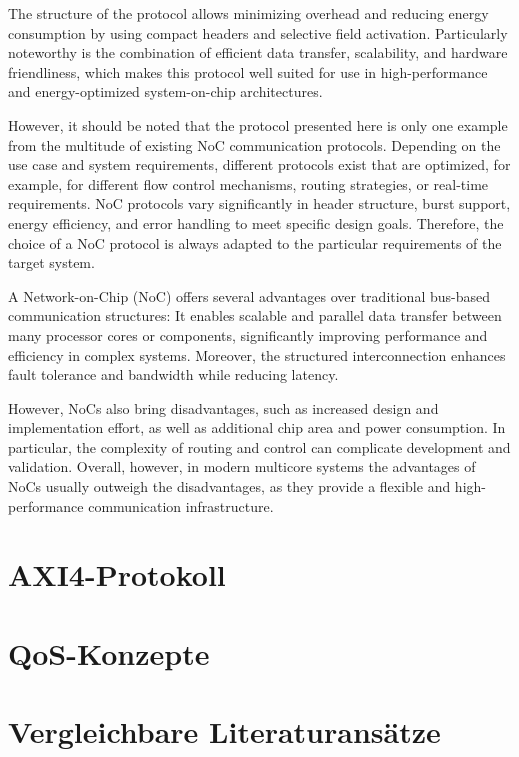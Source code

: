 The structure of the protocol allows minimizing overhead and reducing energy consumption by using compact headers and selective field activation. Particularly noteworthy is the combination of efficient data transfer, scalability, and hardware friendliness, which makes this protocol well suited for use in high-performance and energy-optimized system-on-chip architectures.

However, it should be noted that the protocol presented here is only one example from the multitude of existing NoC communication protocols. Depending on the use case and system requirements, different protocols exist that are optimized, for example, for different flow control mechanisms, routing strategies, or real-time requirements. NoC protocols vary significantly in header structure, burst support, energy efficiency, and error handling to meet specific design goals. Therefore, the choice of a NoC protocol is always adapted to the particular requirements of the target system.

A Network-on-Chip (NoC) offers several advantages over traditional bus-based communication structures: It enables scalable and parallel data transfer between many processor cores or components, significantly improving performance and efficiency in complex systems. Moreover, the structured interconnection enhances fault tolerance and bandwidth while reducing latency.

However, NoCs also bring disadvantages, such as increased design and implementation effort, as well as additional chip area and power consumption. In particular, the complexity of routing and control can complicate development and validation. Overall, however, in modern multicore systems the advantages of NoCs usually outweigh the disadvantages, as they provide a flexible and high-performance communication infrastructure.

\section{AXI4-Protokoll}

\section{QoS-Konzepte}

\section{Vergleichbare Literaturansätze}
